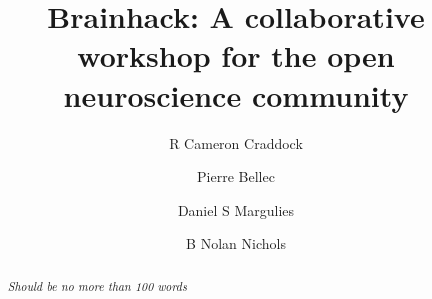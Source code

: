 \documentclass[11pt]{bmc_article_s50}
\begin{document}
\title{Brainhack: A collaborative workshop for the open neuroscience community}

\maketitle

\author[1,2*]{R Cameron Craddock}\cor{}
\author[3]{Pierre Bellec}
\author[4]{Daniel S Margulies}
\author[4]{B Nolan Nichols}

\address[1]{
  Computational Neuroimaging Lab, Center for Biomedical Imaging and \\\hspace*{59pt}Neuromodulation, Nathan S. Kline Institute for Psychiatric Research, \\\hspace*{59pt}140 Old Orangeburg Rd, 10962, Orangeburg, New York, USA
}
\address[2]{
  Center for the Developing Brain, Child Mind Institute, 445 Park Ave,\\\hspace*{59pt} 10022, New York, New York, USA
}

\address[3]{Centre de recherche de l’institut de g\'{e}riatrie de   Montr\'{e}al, Montr\'{e}al, QC, Canada
}

\address[4]{
  Max Planck Research Group for Neuroanatomy \& Connectivity,\\\hspace*{59pt} Max Planck Institute for Human Cognitive and Brain Sciences, \\\hspace*{59pt} Stephanstraße 1A, 04103, Leipzig, Germany
}

\address[5]{
  SRI International, 333 Ravenswood Ave, 94025, Menlo Park,  California, USA
}
  
\address[6]{
  Department of Psychiatry and Behavioral Sciences, Stanford University,\\\hspace*{59pt} 
  1265 Welch Road, 94306, Stanford,  California, USA
}


\begin{abstract}
\emph{Should be no more than 100 words}



\end{abstract}


\end{document}
